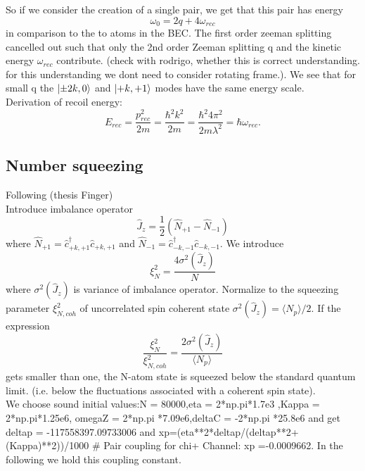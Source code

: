 So if we consider the creation of a single pair, we get that this pair has energy 
\begin{equation}
	\omega_0 = 2q + 4 \omega_{rec}
\end{equation} 
in comparison to the to atoms in the BEC. The first order zeeman splitting cancelled out such that only the 2nd order Zeeman splitting q and the kinetic energy $\omega_{rec}$ contribute. (check with rodrigo, whether this is correct understanding. for this understanding we dont need to consider rotating frame.). We see that for small q the $\ket{\pm 2k,0}$ and $\ket{+k,+1}$ modes have the same energy scale. 
\\
Derivation of recoil energy:
\begin{equation}
	E_{rec} = \frac{p_{rec}^2}{2m} = \frac{\hbar^2 k^2}{2m} = \frac{\hbar^2 4 \pi^2}{2 m \lambda^2} = \hbar \omega_{rec}.
\end{equation}
\subsection{Number squeezing}
Following (thesis Finger)
\\
Introduce imbalance operator
\begin{equation}
	\hat{J}_z = \frac{1}{2} (\hat{N}_{+1}- \hat{N}_{-1})
\end{equation}
where $\hat{N}_{+1} = \hat{c}_{+k,+1}^\dag \hat{c}_{+k,+1}$ and $\hat{N}_{-1} = \hat{c}_{-k,-1}^\dag \hat{c}_{-k,-1}$. 
We introduce 
\begin{equation}
	\xi_N^2 = \frac{4 \sigma^2(\hat{J}_z)}{N}
\end{equation}
where $\sigma^2(\hat{J}_z)$ is variance of imbalance operator. Normalize to the squeezing parameter $\xi_{N,coh}^2$ of uncorrelated spin coherent state $\sigma^2(\hat{J}_z) = \langle N_p \rangle / 2$. If the expression
\begin{equation}
	\frac{\xi_N^2}{\xi^2_{N,coh}} = \frac{2 \sigma^2(\hat{J}_z)}{\langle N_p \rangle}
\end{equation} 
gets smaller than one, the N-atom state is squeezed below the standard quantum limit. (i.e. below the fluctuations associated with a coherent spin state). 
\\
We choose sound initial values:N = 80000,eta = 2*np.pi*1.7e3 ,Kappa = 2*np.pi*1.25e6, omegaZ = 2*np.pi *7.09e6,deltaC = -2*np.pi *25.8e6 and get deltap = -117558397.09733006 and xp=(eta**2*deltap/(deltap**2+(Kappa)**2))/1000 # Pair coupling for chi+ Channel: xp =-0.0009662. In the following we hold this coupling constant.

